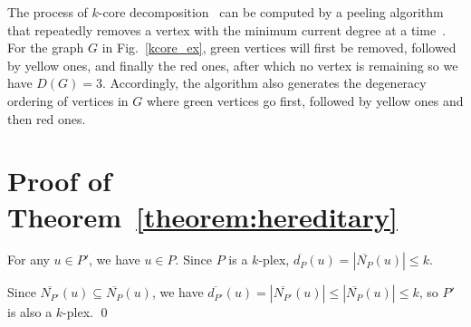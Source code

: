 \documentclass[sigconf, nonacm]{acmart}
\begin{document}
The process of $k$-core decomposition~\cite{seidman1983network} can be computed by a peeling algorithm that repeatedly removes a vertex with the minimum current degree at a time~\cite{bz}. For the graph $G$ in Fig.~\ref{kcore_ex}, green vertices will first be removed, followed by yellow ones, and finally the red ones, after which no vertex is remaining so we have $D(G)=3$. Accordingly, the algorithm also generates the degeneracy ordering of vertices in $G$ where green vertices go first, followed by yellow ones and then red ones.

\section{Proof of Theorem~\ref{theorem:hereditary}}\label{appendix:hereditary}
For any $u\in P'$, we have $u\in P$. Since $P$ is a $k$-plex, $\overline{d_P}(u)=|\overline{N_P}(u)|\leq k$. 

Since $\overline{N_{P'}}(u)\subseteq \overline{N_P}(u)$, we have $\overline{d_{P'}}(u)=|\overline{N_{P'}}(u)|\leq|\overline{N_P}(u)| \leq k$, so $P'$ is also a $k$-plex. \qed
\end{document}
